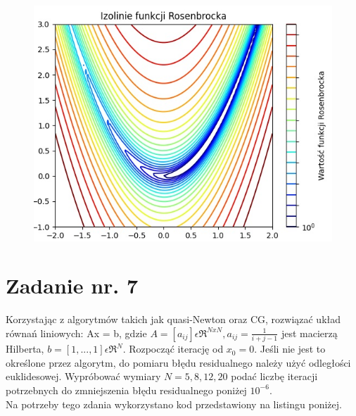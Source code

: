 \documentclass{article}
\begin{document}
\begin{figure}[h]
   \includegraphics[scale=0.7]{zad6.jpg}
   \centering
\end{figure}

\section{Zadanie nr. 7}

Korzystając z algorytmów takich jak quasi-Newton oraz CG, rozwiązać układ
równań liniowych: Ax = b, gdzie $A=[a_{ij}] \epsilon \mathfrak{R}^{NxN}, a_{ij} = \frac{1}{i+j-1}$ jest macierzą
Hilberta, $b = [1, ..., 1] \epsilon \mathfrak{R}^N$. Rozpocząć iterację od $x_0 = 0$. Jeśli nie jest to
określone przez algorytm, do pomiaru błędu residualnego należy użyć odległości
euklidesowej. Wypróbować wymiary $N = 5, 8, 12, 20$ podać liczbę iteracji
potrzebnych do zmniejszenia błędu residualnego poniżej $10^{-6}$.\\

Na potrzeby tego zdania wykorzystano kod przedstawiony na listingu poniżej.
\end{document}
